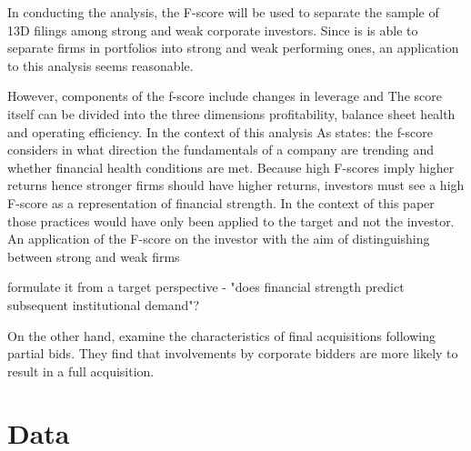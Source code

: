 \documentclass[12pt]{article}
\begin{document}
 In conducting the analysis, the F-score will be used to separate  the sample of 13D filings among strong and weak corporate investors. Since is is able to separate firms in portfolios into strong and weak performing ones, an application to this analysis seems reasonable. 
 
 However, components of the f-score include changes in leverage and The score itself can be divided into the three dimensions profitability, balance sheet health and operating efficiency. 
 In the context of this analysis As \citet{Mohr2012} states: the f-score considers in what direction the fundamentals of a company are trending and whether financial health conditions are met.  Because high F-scores imply higher returns hence stronger firms should have higher returns, investors must see a high F-score as a representation of financial strength. In the context of this paper those practices would have only been applied to the target and not the investor. An application of the F-score on the investor with the aim of distinguishing between strong and weak firms 


\citet{Choi2012} formulate it from a target perspective - "does financial strength predict subsequent institutional demand"? 


On the other hand, \citet{Akhigbe2007} examine the characteristics of final acquisitions following partial bids. They find that involvements by corporate bidders are more likely to result in a full acquisition. 


\section{Data}
\end{document}
